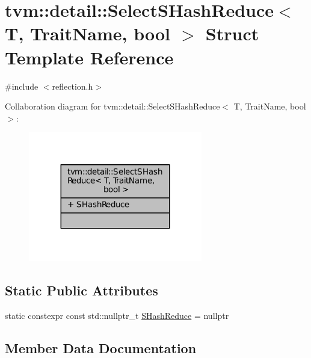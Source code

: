 \hypertarget{structtvm_1_1detail_1_1SelectSHashReduce}{}\section{tvm\+:\+:detail\+:\+:Select\+S\+Hash\+Reduce$<$ T, Trait\+Name, bool $>$ Struct Template Reference}
\label{structtvm_1_1detail_1_1SelectSHashReduce}


{\ttfamily \#include $<$reflection.\+h$>$}



Collaboration diagram for tvm\+:\+:detail\+:\+:Select\+S\+Hash\+Reduce$<$ T, Trait\+Name, bool $>$\+:
\nopagebreak
\begin{figure}[H]
\begin{center}
\leavevmode
\includegraphics[width=215pt]{structtvm_1_1detail_1_1SelectSHashReduce__coll__graph}
\end{center}
\end{figure}
\subsection*{Static Public Attributes}
\begin{DoxyCompactItemize}
\item 
static constexpr const std\+::nullptr\+\_\+t \hyperlink{structtvm_1_1detail_1_1SelectSHashReduce_a15d1f727168445c18ee9d30fa37084cb}{S\+Hash\+Reduce} = nullptr
\end{DoxyCompactItemize}


\subsection{Member Data Documentation}
